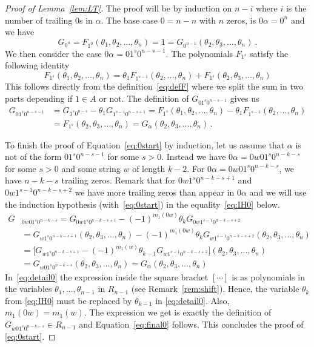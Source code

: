 \documentclass[11pt]{amsart}
\theoremstyle{definition}
\numberwithin{equation}{section}
\begin{document}
\begin{proof}[Proof of Lemma~\ref{lem:LT}]
The proof will be by induction on $n-i$ where $i$ is the number of trailing $0$s in $\alpha$.
The base case $0=n-n$ with $n$ zeros, is $0\alpha = 0^n$ and we have
\[
G_{0^n} = F_{1^0}(\theta_1,\theta_2 ,\ldots,\theta_n) = 1
= G_{0^{n-1}}(\theta_2, \theta_3, \ldots, \theta_n)~.
\]
We then consider the case  $0\alpha=01^s0^{n-s-1}$. The polynomials $F_{1^s}$ satisfy the  following identity
\begin{equation}\label{eq:relF}
F_{1^s}(\theta_1,\theta_2 ,\ldots,\theta_n)
= \theta_1 F_{1^{s-1}}(\theta_2 ,\ldots,\theta_n) + F_{1^s}(\theta_2,\theta_3 ,\ldots,\theta_n)
\end{equation}
This follows directly from the definition~\eqref{eq:defF} where we split the sum in two parts depending if $1\in A$ or not.
The definition of $G_{01^s0^{n-s-1}}$  gives us
\begin{align*}
	G_{01^s0^{n-s-1}}&= G_{1^s0^{n-s}} - \theta_1 G_{1^{s-1}0^{n-s+1}}
	  =F_{1^s}(\theta_1,\theta_2 ,\ldots,\theta_n) - \theta_1 F_{1^{s-1}}(\theta_2 ,\ldots,\theta_n) \\
	  &= F_{1^s}(\theta_2,\theta_3 ,\ldots,\theta_n)= G_{\alpha}(\theta_2,\theta_3 ,\ldots,\theta_n)\,.
\end{align*}

To finish the  proof of Equation~\eqref{eq:0start} by induction,
let us assume that $\alpha$ is not of the form
$01^s0^{n-s-1}$ for some $s>0$.
Instead we have $0\alpha=0w01^s0^{n-k-s}$ for some $s>0$ and some string $w$
of length $k-2$.
For $0\alpha=0w01^s0^{n-k-s}$, we have $n-k-s$ trailing zeros.
Remark that for $0w1^s0^{n-k-s+1}$ and $0w1^{s-1}0^{n-k-s+2}$
we have more trailing zeros than appear in $0\alpha$ and we will use the
induction hypothesis (with~\eqref{eq:0start}) in the
equality~\eqref{eq:IH0} below.%
\begin{align}
	G&_{0w01^s0^{n-k-s}}= G_{0w1^s0^{n-k-s+1}} -  (-1)^{m_1(0w)} \theta_k G_{0w1^{s-1}0^{n-k-s+2}} \nonumber \\
	 & = G_{w1^s0^{n-k-s+1}}(\theta_2,\theta_3 ,\ldots,\theta_n) - (-1)^{m_1(0w)} \theta_k G_{w1^{s-1}0^{n-k-s+2}}(\theta_2,\theta_3 ,\ldots,\theta_n) \label{eq:IH0}\\
	 & = \big[G_{w1^s0^{n-k-s+1}} - (-1)^{m_1(w)} \theta_{k-1} G_{w1^{s-1}0^{n-k-s+2}}\big](\theta_2,\theta_3 ,\ldots,\theta_n)\label{eq:detail0}\\
	 & = G_{w01^s0^{n-k-s}} (\theta_2,\theta_3 ,\ldots,\theta_n)
	   = G_{\alpha} (\theta_2,\theta_3 ,\ldots,\theta_n)  \label{eq:final0}
\end{align}
In~\eqref{eq:detail0} the expression inside the square bracket $[\cdots]$ is as polynomials in the variables $\theta_1,\ldots,\theta_{n-1}$ in $R_{n-1}$ (see Remark~\ref{rem:shift}).
Hence, the variable $\theta_{k}$ from \eqref{eq:IH0} must
be replaced by $\theta_{k-1}$ in \eqref{eq:detail0}.
Also, $m_1(0w)=m_1(w)$. The expression we get is exactly the definition of
$G_{w01^s0^{n-k-s}} \in R_{n-1}$ and Equation~\eqref{eq:final0} follows.
This concludes the proof of \eqref{eq:0start}.


\end{proof}
\end{document}
